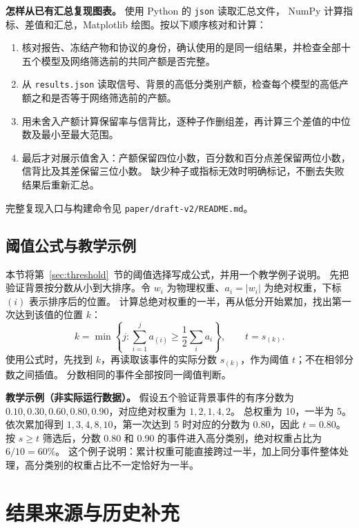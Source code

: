 \documentclass[11pt,a4paper,fontset=fandol,scheme=plain]{ctexart}
\begin{document}
\textbf{怎样从已有汇总复现图表。} 使用 Python 的 \texttt{json} 读取汇总文件，
NumPy 计算指标、差值和汇总，Matplotlib 绘图。按以下顺序核对和计算：
\begin{enumerate}[leftmargin=1.7em,itemsep=2pt]
\item 核对报告、冻结产物和协议的身份，确认使用的是同一组结果，并检查全部十五个模型及网络筛选前的共同产额是否完整。
\item 从 \texttt{results.json} 读取信号、背景的高低分类别产额，检查每个模型的高低产额之和是否等于网络筛选前的产额。
\item 用未舍入产额计算保留率与信背比，逐种子作删组差，再计算三个差值的中位数及最小至最大范围。
\item 最后才对展示值舍入：产额保留四位小数，百分数和百分点差保留两位小数，信背比及其差保留三位小数。
缺少种子或指标无效时明确标记，不删去失败结果后重新汇总。
\end{enumerate}
完整复现入口与构建命令见 \nolinkurl{paper/draft-v2/README.md}。

\subsection{阈值公式与教学示例}
\label{app:threshold}
本节将第~\ref{sec:threshold}~节的阈值选择写成公式，并用一个教学例子说明。
先把验证背景按分数从小到大排序。令 $w_i$ 为物理权重、$a_i=|w_i|$ 为绝对权重，下标 $(i)$ 表示排序后的位置。
计算总绝对权重的一半，再从低分开始累加，找出第一次达到该值的位置 $k$：
\[
 k=\min\left\{j:\sum_{i=1}^{j}a_{(i)}\geq\frac12\sum_i a_i\right\},
 \qquad t=s_{(k)}.
\]
使用公式时，先找到 $k$，再读取该事件的实际分数 $s_{(k)}$，作为阈值 $t$；不在相邻分数之间插值。
分数相同的事件全部按同一阈值判断。

\textbf{教学示例（非实际运行数据）。} 假设五个验证背景事件的有序分数为
$0.10,0.30,0.60,0.80,0.90$，对应绝对权重为 $1,2,1,4,2$。
总权重为 10，一半为 5。依次累加得到 $1,3,4,8,10$，第一次达到 5 时对应的分数为 0.80，因此 $t=0.80$。
按 $s\geq t$ 筛选后，分数 0.80 和 0.90 的事件进入高分类别，绝对权重占比为 $6/10=60\%$。
这个例子说明：累计权重可能直接跨过一半，加上同分事件整体处理，高分类别的权重占比不一定恰好为一半。
\FloatBarrier

\section{结果来源与历史补充}\label{app:provenance}
\end{document}
